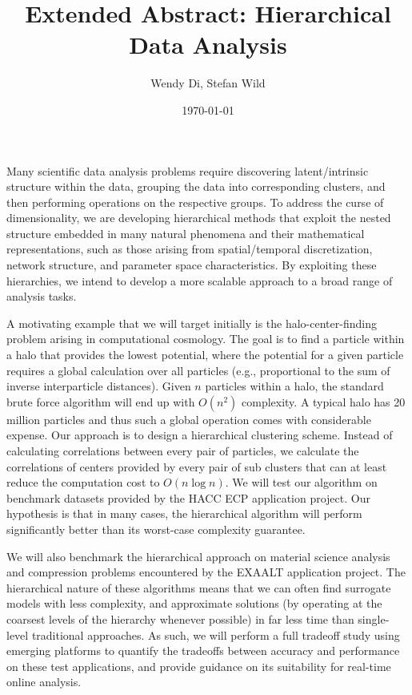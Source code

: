 \documentclass[10pt]{article}
\title{Extended Abstract: Hierarchical Data Analysis}
\author{Wendy Di, Stefan Wild}
\date{\today}
\begin{document}
  \maketitle 

Many scientific data analysis problems require discovering latent/intrinsic structure within the data, grouping the data into corresponding clusters, and then performing operations on the respective groups. To address the curse of dimensionality, we are developing hierarchical methods that exploit the nested structure embedded in many natural phenomena and their mathematical representations, such as those arising from spatial/temporal discretization, network structure, and parameter space characteristics.   By exploiting these hierarchies, we intend to develop a more scalable approach to a broad range of analysis tasks.

A motivating example that we will target initially is the halo-center-finding problem arising in computational cosmology. The goal is to find a particle within a halo that provides the lowest potential, where the potential for a given particle requires a global calculation over all particles (e.g., proportional to the sum of inverse interparticle distances). Given $n$ particles within a halo, the standard brute force algorithm will end up with $O(n^2)$ complexity. A typical halo has 20 million particles and thus such a global operation comes with considerable expense. Our approach is to design a hierarchical clustering scheme. Instead of calculating correlations between every pair of particles, we calculate the correlations of centers provided by every pair of sub clusters that can at least reduce the computation cost to $O(n\log{n})$. We will test our algorithm on benchmark datasets provided by the HACC ECP application project. Our hypothesis is that in many cases, the hierarchical algorithm will perform significantly better than its worst-case complexity guarantee.

We will also benchmark the hierarchical approach on material science analysis and compression problems encountered by the EXAALT application project. The hierarchical nature of these algorithms means that we can often find surrogate models with less complexity, and approximate solutions (by operating at the coarsest levels of the hierarchy whenever possible) in far less time than single-level traditional approaches. As such, we will perform a full tradeoff study using emerging platforms to quantify the tradeoffs between accuracy and performance on these test applications, and provide guidance on its suitability for real-time online analysis. 




\end{document}
